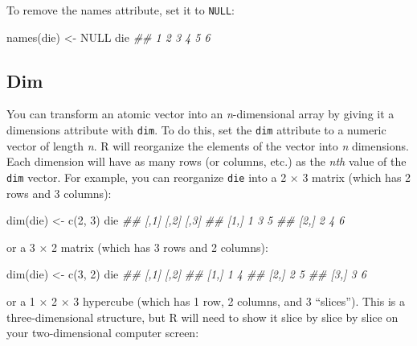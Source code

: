\documentclass[
  letterpaper,
  DIV=11,
  numbers=noendperiod]{scrbook}
\newenvironment{Shaded}{\begin{snugshade}}{\end{snugshade}}
\newcommand{\ConstantTok}[1]{\textcolor[rgb]{0.56,0.35,0.01}{#1}}
\newcommand{\DecValTok}[1]{\textcolor[rgb]{0.68,0.00,0.00}{#1}}
\newcommand{\DocumentationTok}[1]{\textcolor[rgb]{0.37,0.37,0.37}{\textit{#1}}}
\newcommand{\FunctionTok}[1]{\textcolor[rgb]{0.28,0.35,0.67}{#1}}
\newcommand{\NormalTok}[1]{\textcolor[rgb]{0.00,0.23,0.31}{#1}}
\newcommand{\OtherTok}[1]{\textcolor[rgb]{0.00,0.23,0.31}{#1}}
\begin{document}
To remove the names attribute, set it to \texttt{NULL}:

\begin{Shaded}
\begin{Highlighting}[]
\FunctionTok{names}\NormalTok{(die) }\OtherTok{\textless{}{-}} \ConstantTok{NULL}
\NormalTok{die}
\DocumentationTok{\#\#  1 2 3 4 5 6}
\end{Highlighting}
\end{Shaded}

\subsection{Dim}\label{dim}

You can transform an atomic vector into an \emph{n}-dimensional array by
giving it a dimensions attribute with \texttt{dim}. To do this, set the
\texttt{dim} attribute to a numeric vector of length \emph{n}. R will
reorganize the elements of the vector into \emph{n} dimensions. Each
dimension will have as many rows (or columns, etc.) as the \emph{nth}
value of the \texttt{dim} vector. For example, you can reorganize
\texttt{die} into a 2 × 3 matrix (which has 2 rows and 3 columns):

\begin{Shaded}
\begin{Highlighting}[]
\FunctionTok{dim}\NormalTok{(die) }\OtherTok{\textless{}{-}} \FunctionTok{c}\NormalTok{(}\DecValTok{2}\NormalTok{, }\DecValTok{3}\NormalTok{)}
\NormalTok{die}
\DocumentationTok{\#\#      [,1] [,2] [,3]}
\DocumentationTok{\#\# [1,]    1    3    5}
\DocumentationTok{\#\# [2,]    2    4    6}
\end{Highlighting}
\end{Shaded}

or a 3 × 2 matrix (which has 3 rows and 2 columns):

\begin{Shaded}
\begin{Highlighting}[]
\FunctionTok{dim}\NormalTok{(die) }\OtherTok{\textless{}{-}} \FunctionTok{c}\NormalTok{(}\DecValTok{3}\NormalTok{, }\DecValTok{2}\NormalTok{)}
\NormalTok{die}
\DocumentationTok{\#\#      [,1] [,2]}
\DocumentationTok{\#\# [1,]    1    4}
\DocumentationTok{\#\# [2,]    2    5}
\DocumentationTok{\#\# [3,]    3    6}
\end{Highlighting}
\end{Shaded}

or a 1 × 2 × 3 hypercube (which has 1 row, 2 columns, and 3 ``slices'').
This is a three-dimensional structure, but R will need to show it slice
by slice by slice on your two-dimensional computer screen:
\end{document}
